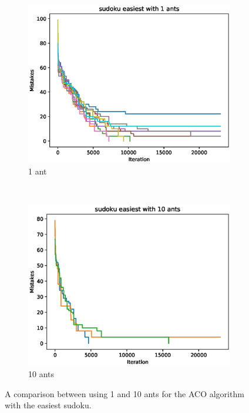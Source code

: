 \documentclass[11pt]{article}
\begin{document}
\begin{figure}[H]
    \centering
    \begin{subfigure}[t]{0.48\textwidth}
        \centering
        \includegraphics[width=\textwidth]{images/sudoku_easiest_1.eps}
        \caption{1 ant}
        \label{fig:sudoku_easy_1}
    \end{subfigure}%
    ~
    \begin{subfigure}[t]{0.48\textwidth}
        \centering
        \includegraphics[width=\textwidth]{images/sudoku_easiest_10.eps}
        \caption{10 ants}
        \label{fig:sudoku_easy_10}
    \end{subfigure} 
    \caption{A comparison between using 1 and 10 ants for the ACO algorithm with the easiest sudoku.}
    \label{fig:sudoku_easy}
\end{figure}
\end{document}
